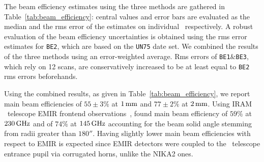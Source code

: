 The beam efficiency estimates using the three methods are gathered
in Table~\ref{tab:beam_efficiency}: central values and error
bars are evaluated as the median and the rms error of the
estimates on individual \bms\ respectively. A robust evaluation of the
beam efficiency uncertainties is obtained using the rms error estimates
for {\tt BE2}, which are based on the {\tt UN75} date set. We combined the
results of the three methods using an error-weighted average. Rms
errors of {\tt BE1$\&$BE3}, which rely on 12 scans, are conservatively
increased to be at least equal to {\tt BE2} rms errors beforehands.

Using the combined results, as given in
Table~\ref{tab:beam_efficiency}, we report main beam efficiencies of
$55 \pm 3 \%$ at $1\,\rm{mm}$ and  $77 \pm 2 \%$ at $2\,\rm{mm}$.
{\lp Using IRAM \trentemetre\ telescope EMIR frontend
observations~\citep{Carter2012}, \citet{Kramer2013} found main
beam efficiency of $59\%$ at $230\,\rm{GHz}$ and of $74\%$ at
$145\,\rm{GHz}$ accounting for the beam solid angle stemming from
radii greater than $180''$. Having slightly lower main beam
efficiencies with respect to EMIR is expected
since EMIR detectors were coupled to the \trentemetre\ telescope
entrance pupil via corrugated horns, unlike the NIKA2 ones.} 
  

